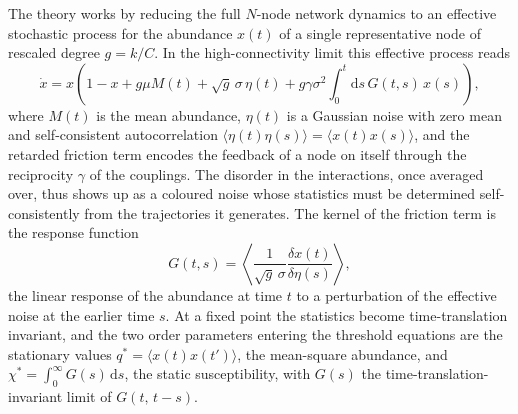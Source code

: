 The theory works by reducing the full $N$-node network dynamics to an effective
stochastic process for the abundance $x(t)$ of a single representative node of
rescaled degree $g = k/C$. In the high-connectivity limit this effective process
reads \citep{aguirrelopez}
\begin{equation}
    \dot{x} = x\left( 1 - x + g\mu M(t) + \sqrt{g}\,\sigma\,\eta(t)
              + g\gamma\sigma^2 \int_0^t \mathrm{d}s\, G(t,s)\, x(s) \right),
    \label{eq:dmft-effective}
\end{equation}
where $M(t)$ is the mean abundance, $\eta(t)$ is a Gaussian noise with zero mean
and self-consistent autocorrelation $\langle \eta(t)\eta(s)\rangle =
\langle x(t)x(s)\rangle$, and the retarded friction term encodes the feedback of a
node on itself through the reciprocity $\gamma$ of the couplings. The disorder in
the interactions, once averaged over, thus shows up as a coloured noise whose
statistics must be determined self-consistently from the trajectories it
generates. The kernel of the friction term is the response function
\begin{equation}
    G(t,s) = \left\langle \frac{1}{\sqrt{g}\,\sigma}
             \frac{\delta x(t)}{\delta \eta(s)} \right\rangle,
    \label{eq:response-def}
\end{equation}
the linear response of the abundance at time $t$ to a perturbation of the
effective noise at the earlier time $s$. At a fixed point the statistics become
time-translation invariant, and the two order parameters entering the threshold
equations are the stationary values $q^\ast = \langle x(t)x(t')\rangle$, the
mean-square abundance, and $\chi^\ast = \int_0^\infty G(s)\,\mathrm{d}s$, the
static susceptibility, with $G(s)$ the time-translation-invariant limit of
$G(t,\,t-s)$.

